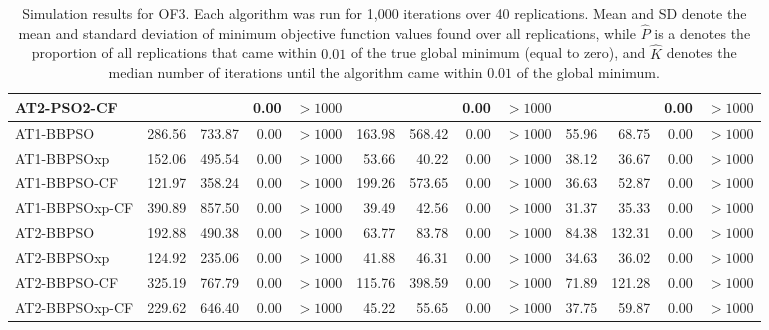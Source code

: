 \documentclass[cmbright]{staauth}
\numberwithin{table}{section}
\begin{document}
\begin{table}[ht]
\begin{tabular}{l|rrrr|rrrr|rrrr}
  AT2-PSO2-CF &  &  & 0.00 & $> 1000$ &  &  & 0.00 & $> 1000$ &  &  & 0.00 & $> 1000$ \\
   \hline
AT1-BBPSO & 286.56 & 733.87 & 0.00 & $> 1000$ & 163.98 & 568.42 & 0.00 & $> 1000$ & 55.96 & 68.75 & 0.00 & $> 1000$ \\
  AT1-BBPSOxp & 152.06 & 495.54 & 0.00 & $> 1000$ & 53.66 & 40.22 & 0.00 & $> 1000$ & 38.12 & 36.67 & 0.00 & $> 1000$ \\
  AT1-BBPSO-CF & 121.97 & 358.24 & 0.00 & $> 1000$ & 199.26 & 573.65 & 0.00 & $> 1000$ & 36.63 & 52.87 & 0.00 & $> 1000$ \\
  AT1-BBPSOxp-CF & 390.89 & 857.50 & 0.00 & $> 1000$ & 39.49 & 42.56 & 0.00 & $> 1000$ & 31.37 & 35.33 & 0.00 & $> 1000$ \\
   \hline
AT2-BBPSO & 192.88 & 490.38 & 0.00 & $> 1000$ & 63.77 & 83.78 & 0.00 & $> 1000$ & 84.38 & 132.31 & 0.00 & $> 1000$ \\
  AT2-BBPSOxp & 124.92 & 235.06 & 0.00 & $> 1000$ & 41.88 & 46.31 & 0.00 & $> 1000$ & 34.63 & 36.02 & 0.00 & $> 1000$ \\
  AT2-BBPSO-CF & 325.19 & 767.79 & 0.00 & $> 1000$ & 115.76 & 398.59 & 0.00 & $> 1000$ & 71.89 & 121.28 & 0.00 & $> 1000$ \\
  AT2-BBPSOxp-CF & 229.62 & 646.40 & 0.00 & $> 1000$ & 45.22 & 55.65 & 0.00 & $> 1000$ & 37.75 & 59.87 & 0.00 & $> 1000$ \\
   \hline
\end{tabular}
\endgroup
\caption{Simulation results for OF3. Each algorithm was run for 1,000 iterations over 40 replications. Mean and SD denote the mean and standard deviation of minimum objective function values found over all replications, while $\widehat{P}$ is a denotes the proportion of all replications that came within $0.01$ of the true global minimum (equal to zero), and $\widehat{K}$ denotes the median number of iterations until the algorithm came within $0.01$ of the global minimum.}
\label{tab:psosim3}
\end{table}
\end{document}
